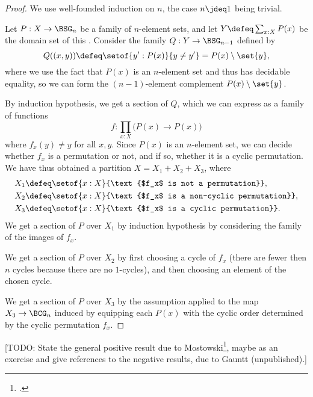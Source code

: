 \begin{proof}
  We use well-founded induction on $n$, the case $n\jdeq 1$ being trivial.

  Let $P : X \to \BSG_n$ be a family of $n$-element sets,
  and let $Y \defeq \sum_{x:X}P(x)$ be the domain set of this \covering.
  Consider the family $Q : Y \to \BSG_{n-1}$ defined by
  \[
    Q((x,y)) \defeq \setof{y' : P(x)}{y \ne y'} = P(x) \setminus \set{y},
  \]
  where we use the fact that $P(x)$ is an $n$-element set
  and thus has decidable equality,
  so we can form the $(n-1)$-element complement $P(x) \setminus
  \set{y}$.

  By induction hypothesis, we get a section of $Q$, which we can
  express as a family of functions
  \[
    f : \prod_{x:X}\bigl(P(x) \to P(x)\bigr)
  \]
  where $f_x(y) \ne y$ for all $x,y$.
  Since $P(x)$ is an $n$-element set, we can decide whether $f_x$
  is a permutation or not, and if so, whether it is a cyclic
  permutation.
  We have thus obtained a partition $X = X_1 + X_2 + X_3$,
  where
  \begin{align*}
    X_1 &\defeq \setof{x:X}{\text{$f_x$ is not a permutation}}, \\
    X_2 &\defeq \setof{x:X}{\text{$f_x$ is a non-cyclic permutation}}, \\
    X_3 &\defeq \setof{x:X}{\text{$f_x$ is a cyclic permutation}}.
  \end{align*}
  We get a section of $P$ over $X_1$ by induction hypothesis
  by considering the family of the images of $f_x$.

  We get a section of $P$ over $X_2$ by first choosing a cycle of $f_x$
  (there are fewer then $n$ cycles because there are no $1$-cycles),
  and then choosing an element of the chosen cycle.

  We get a section of $P$ over $X_3$ by the assumption applied
  to the map $X_3 \to \BCG_n$ induced by equipping each $P(x)$ with
  the cyclic order determined by the cyclic permutation $f_x$.
\end{proof}

[TODO: State the general positive result due to
Mostowski\footcite{Mostowski-Finite-Choice}, maybe as an exercise
and give references to the negative results, due to Gauntt (unpublished).]

